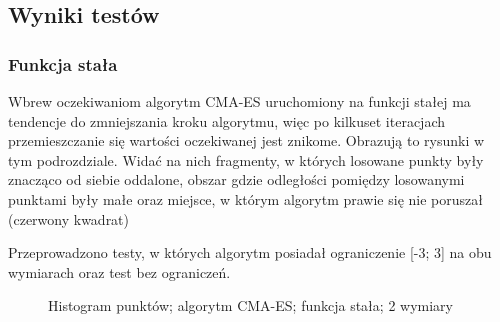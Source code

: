 \documentclass{mini}
\begin{document}
\subsection{Wyniki testów}

\subsubsection*{Funkcja stała}
Wbrew oczekiwaniom algorytm CMA-ES uruchomiony na funkcji stałej ma tendencje do zmniejszania kroku algorytmu, więc po kilkuset iteracjach przemieszczanie się wartości oczekiwanej jest znikome. Obrazują to rysunki w tym podrozdziale. Widać na nich fragmenty, w których losowane punkty były znacząco od siebie oddalone, obszar gdzie odległości pomiędzy losowanymi punktami były małe oraz miejsce, w którym algorytm prawie się nie poruszał (czerwony kwadrat)

Przeprowadzono testy, w których algorytm posiadał ograniczenie [-3; 3] na obu wymiarach oraz test bez ograniczeń.

\begin{figure}[H]
\centering
{}
\quad
{}
\caption{Histogram punktów; algorytm CMA-ES; funkcja stała; 2 wymiary}
\end{figure}
\end{document}
